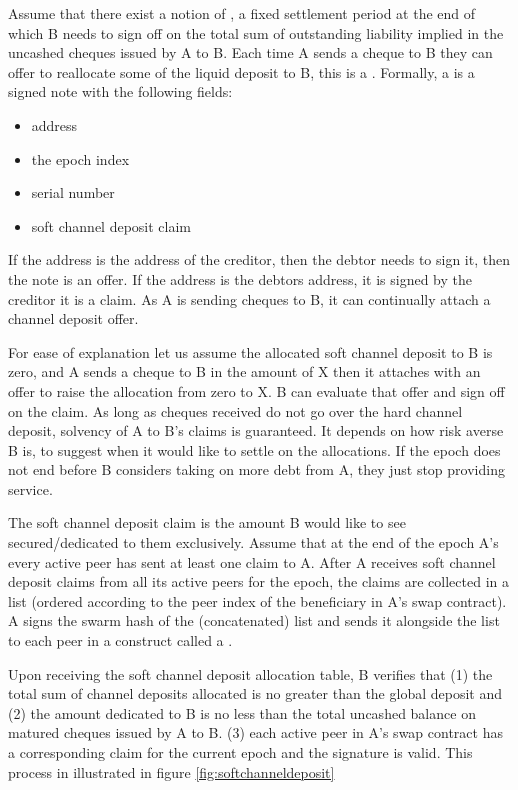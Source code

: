 Assume that there exist a notion of ,
a fixed settlement period at the end of which B needs to sign off on the total sum of outstanding liability implied in the uncashed cheques issued by A to B.
Each time A sends a cheque to B they can offer to reallocate some of the liquid deposit to B, this is a . 
Formally, a  is a signed note with the following fields:

\begin{itemize}
  \item address
  \item the epoch index
  \item serial number
  \item soft channel deposit claim
\end{itemize}

If the address is the address of the creditor, then the debtor needs to sign it, then the note is an offer. 
If the address is the debtors address, it is signed by the creditor it is a claim. As A is sending cheques to B, it can continually attach a channel deposit offer.

For ease of explanation let us assume the allocated soft channel deposit to B is zero, and A sends a cheque to B in the amount of X then it attaches with an offer to raise the allocation from zero to X. 
B can evaluate that offer and sign off on the claim. 
As long as cheques received do not go over the  hard channel deposit, solvency of A to B's claims is guaranteed. It depends on how risk averse B is, to suggest when it would like to settle on the allocations. If the epoch does not end before B considers taking on more debt from A, they just stop providing service. 

The soft channel deposit claim is the amount B would like to see secured/dedicated to them exclusively.
Assume that at the end of the epoch A's every  active peer has sent at least one claim to A.
After A receives soft channel deposit claims from all its active peers for the epoch, the claims are
collected in a list (ordered according to the peer index of the beneficiary in A's swap contract).
A signs the swarm hash of the (concatenated) list and sends it alongside the list to each peer
in a construct called a .

Upon receiving the soft channel deposit allocation table, B verifies that
(1) the total sum of channel deposits allocated is no greater than the global deposit and
(2) the amount dedicated to B is no less than the total uncashed balance on matured cheques issued by A to B.
(3) each active peer in A's swap contract has a corresponding claim for the current epoch and the signature is valid.
This process in illustrated in figure \ref{fig:softchanneldeposit}



